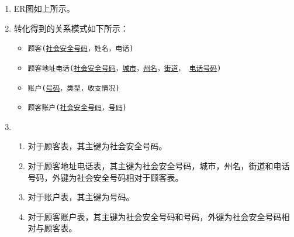 \documentclass[10pt,a4paper]{article}
\begin{document}
	\begin{enumerate} 
		\item ER图如上所示。
		\item 转化得到的关系模式如下所示：
		\begin{itemize}
			\item \texttt{顾客(\underline{社会安全号码}，姓名，电话)}
			\item \texttt{顾客地址电话(\underline{社会安全号码}，\underline{城市}，\underline{州名}，\underline{街道}， \underline{电话号码})}
			\item \texttt{账户(\underline{号码}，类型，收支情况)}
			\item \texttt{顾客账户(\underline{社会安全号码}，\underline{号码})}
		\end{itemize}
		\item \begin{enumerate}
			\item 对于顾客表，其主键为社会安全号码。
			\item 对于顾客地址电话表，其主键为社会安全号码，城市，州名，街道和电话号码，外键为社会安全号码相对于顾客表。
			\item 对于账户表，其主键为号码。
			\item 对于顾客账户表，其主键为社会安全号码和号码，外键为社会安全号码相对与顾客表。
		\end{enumerate}
	\end{enumerate}
	\newpage
\end{document}
